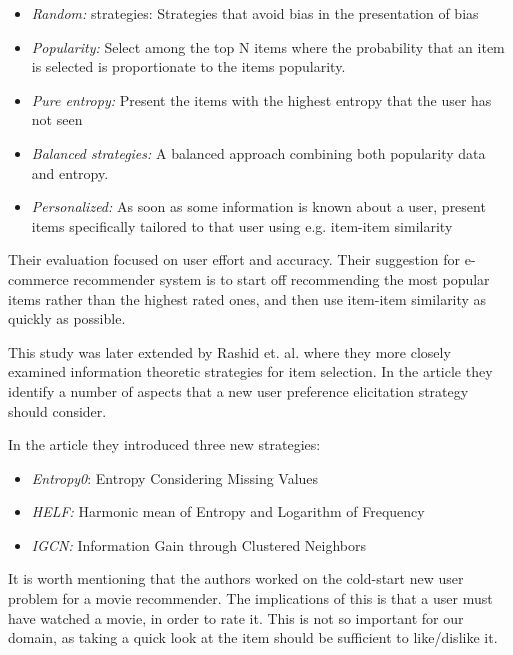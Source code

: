 \begin{itemize}
\item \emph{Random:} strategies: Strategies that avoid bias in the presentation
of bias
\item \emph{Popularity:} Select among the top N items where the probability
that an item is selected is proportionate to the items popularity.
\item \emph{Pure entropy:} Present the items with the highest entropy that the
user has not seen
\item \emph{Balanced strategies:} A balanced approach combining both popularity
data and entropy.
\item \emph{Personalized:} As soon as some information is known about a user,
present items specifically tailored to that user using e.g. item-item
similarity
\end{itemize}

Their evaluation focused on user effort and accuracy. Their suggestion for
e-commerce recommender system is to start off recommending the most popular
items rather than the highest rated ones, and then use item-item similarity as
quickly as possible.

This study was later extended by Rashid et. al. \cite{Rashid2008} where they
more closely examined information theoretic strategies for item selection. In
the article they identify a number of aspects that a new user preference
elicitation strategy should consider.

In the article they introduced three new strategies:

\begin{itemize}
\item \emph{Entropy0}: Entropy Considering Missing Values
\item \emph{HELF:} Harmonic mean of Entropy and Logarithm of Frequency
\item \emph{IGCN:} Information Gain through Clustered Neighbors
\end{itemize}



It is worth mentioning that the authors worked on the cold-start new user
problem for a movie recommender. The implications of this is that a user must
have watched a movie, in order to rate it. This is not so important for our
domain, as taking a quick look at the item should be sufficient to like/dislike
it.

